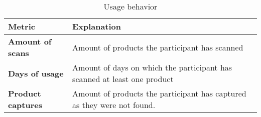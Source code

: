 \begin{table}[H]
\centering
\begin{tabular}{p{4cm} p{10cm}}
\toprule
Metric & Explanation\\
\midrule
\textbf{Amount of scans}   &	Amount of products the participant has scanned \\
\textbf{Days of usage}   &	Amount of days on which the participant has scanned at least one product \\
\textbf{Product captures}   &	Amount of products the participant has captured as they were not found. \\
\bottomrule
\end{tabular}
\caption{Usage behavior}
\end{table}
\label{table:user-behavior}